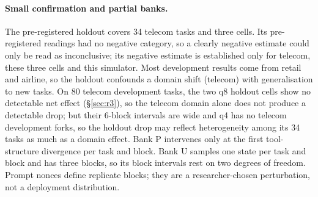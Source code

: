 \paragraph{Small confirmation and partial banks.} The pre-registered holdout covers 34 telecom tasks and three cells. Its pre-registered readings had no negative category, so a clearly negative estimate could only be read as inconclusive; its negative estimate is established only for telecom, these three cells and this simulator. Most development results come from retail and airline, so the holdout confounds a domain shift (telecom) with generalisation to new tasks. %
On 80 telecom development tasks, the two q8 holdout cells show no detectable net effect (\S\ref{sec:r3}), so the telecom domain alone does not produce a detectable drop; but their 6-block intervals are wide and q4 has no telecom development forks, so the holdout drop may reflect heterogeneity among its 34 tasks as much as a domain effect. %
Bank P intervenes only at the first tool-structure divergence per task and block. Bank U samples one state per task and block and has three blocks, so its block intervals rest on two degrees of freedom. Prompt nonces define replicate blocks; they are a researcher-chosen perturbation, not a deployment distribution.
